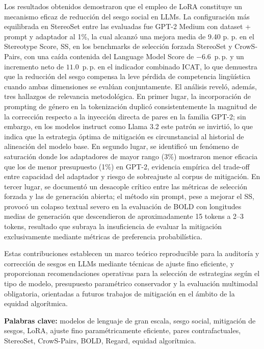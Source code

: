 \documentclass[12pt,a4paper]{report}
\begin{document}
Los resultados obtenidos demostraron que el empleo de LoRA constituye un mecanismo eficaz de reducción del sesgo social en LLMs. La configuración más equilibrada en StereoSet entre las evaluadas fue GPT-2 Medium con dataset + prompt y adaptador al 1\%, la cual alcanzó una mejora media de 9.40 p. p. en el Stereotype Score, SS, en los benchmarks de selección forzada StereoSet y CrowS-Pairs, con una caída contenida del Language Model Score de $-6.6$~p.\,p. y un incremento neto de $11.0$~p.\,p. en el indicador combinado ICAT, lo que demuestra que la reducción del sesgo compensa la leve pérdida de competencia lingüística cuando ambas dimensiones se evalúan conjuntamente. El análisis reveló, además, tres hallazgos de relevancia metodológica. En primer lugar, la incorporación de prompting de género en la tokenización duplicó consistentemente la magnitud de la corrección respecto a la inyección directa de pares en la familia GPT-2; sin embargo, en los modelos instruct como Llama 3.2 este patrón se invirtió, lo que indica que la estrategia óptima de mitigación es circunstancial al historial de alineación del modelo base. En segundo lugar, se identificó un fenómeno de saturación donde los adaptadores de mayor rango (3\%) mostraron menor eficacia que los de menor presupuesto (1\%) en GPT-2, evidencia empírica del trade-off entre capacidad del adaptador y riesgo de sobreajuste al corpus de mitigación. En tercer lugar, se documentó un desacople crítico entre las métricas de selección forzada y las de generación abierta; el método sin prompt, pese a mejorar el SS, provocó un colapso textual severo en la evaluación de BOLD con longitudes medias de generación que descendieron de aproximadamente 15 tokens a 2–3 tokens, resultado que subraya la insuficiencia de evaluar la mitigación exclusivamente mediante métricas de preferencia probabilística.

Estas contribuciones establecen un marco teórico reproducible para la auditoría y corrección de sesgos en LLMs mediante técnicas de ajuste fino eficiente, y proporcionan recomendaciones operativas para la selección de estrategias según el tipo de modelo, presupuesto paramétrico conservador y la evaluación multimodal obligatoria, orientadas a futuros trabajos de mitigación en el ámbito de la equidad algorítmica.

\textbf{Palabras clave:} modelos de lenguaje de gran escala, sesgo social, mitigación de sesgos, LoRA, ajuste fino paramétricamente eficiente, pares contrafactuales, StereoSet, CrowS-Pairs, BOLD, Regard, equidad algorítmica.
\end{document}
